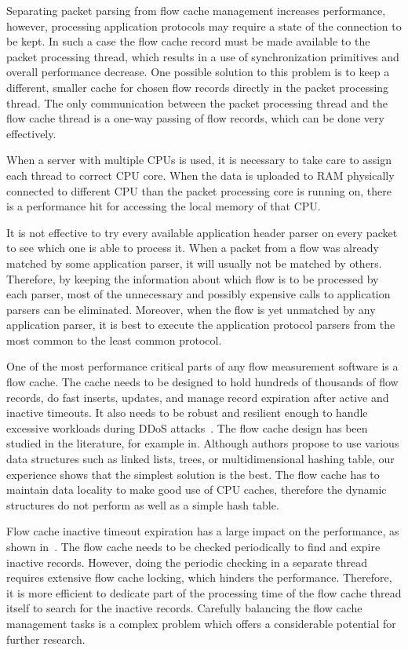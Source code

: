 Separating packet parsing from flow cache management increases performance, however, processing application protocols may require a state of the connection to be kept. In such a case the flow cache record must be made available to the packet processing thread, which results in a use of synchronization primitives and overall performance decrease. One possible solution to this problem is to keep a different, smaller cache for chosen flow records directly in the packet processing thread. The only communication between the packet processing thread and the flow cache thread is a one-way passing of flow records, which can be done very effectively.

When a server with multiple CPUs is used, it is necessary to take care to assign each thread to correct CPU core. When the data is uploaded to RAM physically connected to different CPU than the packet processing core is running on, there is a performance hit for accessing the local memory of that CPU.

It is not effective to try every available application header parser on every packet to see which one is able to process it. When a packet from a flow was already matched by some application parser, it will usually not be matched by others. Therefore, by keeping the information about which flow is to be processed by each parser, most of the unnecessary and possibly expensive calls to application parsers can be eliminated. Moreover, when the flow is yet unmatched by any application parser, it is best to execute the application protocol parsers from the most common to the least common protocol.

One of the most performance critical parts of any flow measurement software is a flow cache. The cache needs to be designed to hold hundreds of thousands of flow records, do fast inserts, updates, and manage record expiration after active and inactive timeouts. It also needs to be robust and resilient enough to handle excessive workloads during DDoS attacks~\cite{Sadre-2012-Effects}. The flow cache design has been studied in the literature, for example in\cite{Wang-2011-Memory, Nassopulos-2014-Flow}. Although authors propose to use various data structures such as linked lists, trees, or multidimensional hashing table, our experience shows that the simplest solution is the best. The flow cache has to maintain data locality to make good use of CPU caches, therefore the dynamic structures do not perform as well as a simple hash table.

Flow cache inactive timeout expiration has a large impact on the performance, as shown in~\cite{Rodriguez-2013-Empirical, Molina-2006-Design}. The flow cache needs to be checked periodically to find and expire inactive records. However, doing the periodic checking in a separate thread requires extensive flow cache locking, which hinders the performance. Therefore, it is more efficient to dedicate part of the processing time of the flow cache thread itself to search for the inactive records. Carefully balancing the flow cache management tasks is a complex problem which offers a considerable potential for further research.

